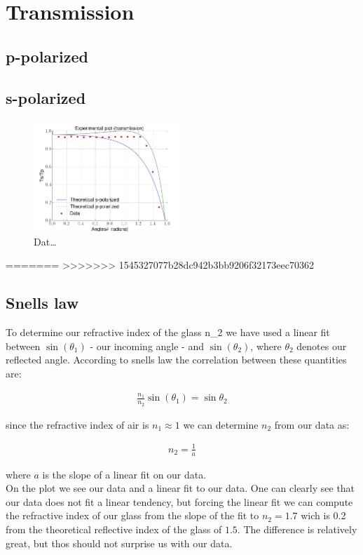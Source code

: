 \section{Transmission}
\subsection{p-polarized}
\subsection{s-polarized}
\begin{figure}[h]
    \centering
    \includegraphics[width=0.5\textwidth]{transmission}
    \caption{Dat\ldots}
    \label{fig:transmission}
\end{figure}
=======
>>>>>>> 1545327077b28dc942b3bb9206f32173eec70362

\subsection{Snells law}

To determine our refractive index of the glass {n_2} we have used a linear fit between $\sin(\theta_1)$ - our incoming angle - and $\sin(\theta_2)$, where $\theta_2$ denotes our reflected angle. According to snells law the correlation between these quantities are:

\begin{align}
\frac{n_1}{n_2}\sin(\theta_1)=\sin{\theta_2}
\end{align}

since the refractive index of air is $n_1 \approx 1$ we can determine $n_2$ from our data as:

\begin{align}
n_2=\frac{1}{a}
\end{align}

where $a$ is the slope of a linear fit on our data. \\

On the plot we see our data and a linear fit to our data. One can clearly see that our data does not fit a linear tendency, but forcing the linear fit we can compute the refractive index of our glass from the slope of the fit to $n_2=1.7$ wich is 0.2 from the theoretical reflective index of the glass of $1.5$. The difference is relatively great, but thos should not surprise us with our data. 

